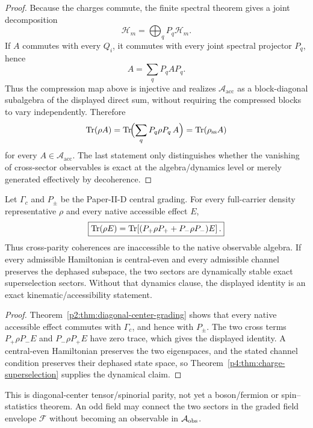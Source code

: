 \documentclass[12pt,a4paper]{article}
\begin{document}
\begin{proof}
Because the charges commute, the finite spectral theorem gives a joint decomposition
\[
\mathcal H_m=\bigoplus_q P_q\mathcal H_m.
\]
If $A$ commutes with every $Q_i$, it commutes with every joint spectral projector $P_q$, hence
\[
A=\sum_q P_qAP_q.
\]
Thus the compression map above is injective and realizes $\mathcal A_{\mathrm{acc}}$ as a block-diagonal subalgebra of the displayed direct sum, without requiring the compressed blocks to vary independently.
Therefore
\[
\operatorname{Tr}(\rho A)=\operatorname{Tr}\!\Bigl(\sum_q P_q\rho P_q\,A\Bigr)=\operatorname{Tr}(\rho_{\mathrm{ss}}A)
\]
for every $A\in\mathcal A_{\mathrm{acc}}$.
The last statement only distinguishes whether the vanishing of cross-sector observables is exact at the algebra/dynamics level or merely generated effectively by decoherence.
\end{proof}

\begin{corollary}
\label{p4:cor:central-parity-superselection}
Let \(\Gamma_c\) and \(P_\pm\) be the Paper-II-D central grading.  For every
full-carrier density representative \(\rho\) and every native accessible
effect \(E\),
\[
 \boxed{
 \operatorname{Tr}(\rho E)
 =\operatorname{Tr}\!\left[(P_+\rho P_++P_-\rho P_-)E\right].}
\]
Thus cross-parity coherences are inaccessible to the native observable
algebra.  If every admissible Hamiltonian is central-even and every admissible
channel preserves the dephased subspace, the two sectors are dynamically
stable exact superselection sectors.  Without that dynamics clause, the
displayed identity is an exact kinematic/accessibility statement.
\end{corollary}

\begin{proof}
Theorem~\ref{p2:thm:diagonal-center-grading} shows that every native
accessible effect commutes with \(\Gamma_c\), and hence with \(P_\pm\).  The
two cross terms \(P_+\rho P_-E\) and \(P_-\rho P_+E\) have zero trace, which
gives the displayed identity.  A central-even Hamiltonian preserves the two
eigenspaces, and the stated channel condition preserves their dephased state
space, so Theorem~\ref{p4:thm:charge-superselection} supplies the dynamical
claim.
\end{proof}

\begin{remark}
\label{p4:rem:central-parity-field-boundary}
This is diagonal-center tensor/spinorial parity, not yet a boson/fermion or
spin--statistics theorem.  An odd field may connect the two sectors in the
graded field envelope \(\mathcal F\) without becoming an observable in
\(\mathcal A_{\rm obs}\).
\end{remark}
\end{document}
